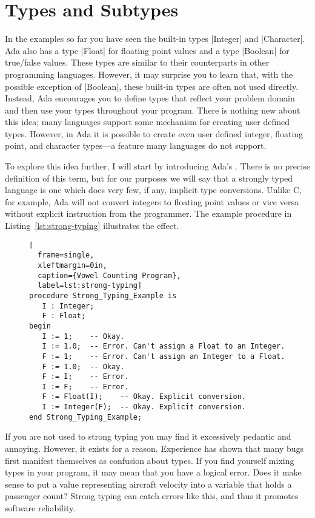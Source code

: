 \section{Types and Subtypes}

In the examples so far you have seen the built-in types |Integer| and |Character|. Ada also has
a type |Float| for floating point values and a type |Boolean| for true/false values. These types
are similar to their counterparts in other programming languages. However, it may surprise you
to learn that, with the possible exception of |Boolean|, these built-in types are often not used
directly. Instead, Ada encourages you to define types that reflect your problem domain and then
use your types throughout your program. There is nothing new about this idea; many languages
support some mechanism for creating user defined types. However, in Ada it is possible to create
even user defined integer, floating point, and character types---a feature many languages do not
support.

To explore this idea further, I will start by introducing Ada's . There
is no precise definition of this term, but for our purposes we will say that a strongly typed
language is one which does very few, if any, implicit type conversions. Unlike C, for example,
Ada will not convert integers to floating point values or vice versa without explicit
instruction from the programmer. The example procedure in Listing~\ref{lst:strong-typing}
illustrates the effect.

\begin{figure}[tbhp]
\begin{lstlisting}[
  frame=single,
  xleftmargin=0in,
  caption={Vowel Counting Program},
  label=lst:strong-typing]
procedure Strong_Typing_Example is
   I : Integer;
   F : Float;
begin
   I := 1;    -- Okay.
   I := 1.0;  -- Error. Can't assign a Float to an Integer.
   F := 1;    -- Error. Can't assign an Integer to a Float.
   F := 1.0;  -- Okay.
   F := I;    -- Error.
   I := F;    -- Error.
   F := Float(I);    -- Okay. Explicit conversion.
   I := Integer(F);  -- Okay. Explicit conversion.
end Strong_Typing_Example;
\end{lstlisting}
\end{figure}

If you are not used to strong typing you may find it excessively pedantic and annoying. However,
it exists for a reason. Experience has shown that many bugs first manifest themselves as
confusion about types. If you find yourself mixing types in your program, it may mean that you
have a logical error. Does it make sense to put a value representing aircraft velocity into a
variable that holds a passenger count? Strong typing can catch errors like this, and thus it
promotes software reliability.

